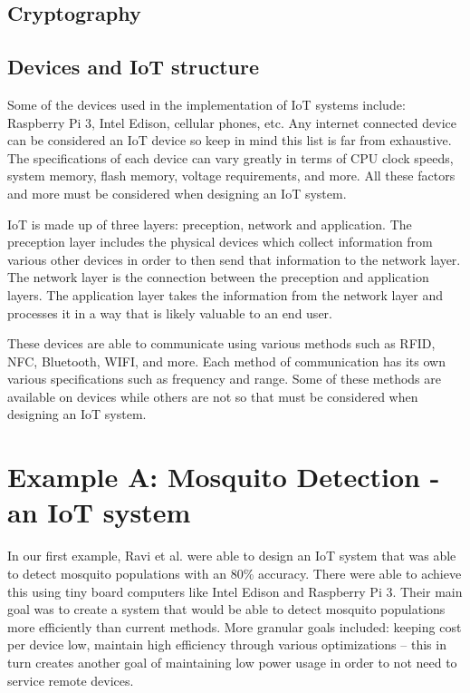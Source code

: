 \documentclass{sig-alternate}
\begin{document}
\subsection{Cryptography}
\label{sec:cryptography}


\subsection{Devices and IoT structure}
\label{sec:devices}


Some of the devices used in the implementation of IoT systems include: Raspberry Pi 3, Intel Edison, cellular phones, etc. Any internet connected device can be considered an IoT device so keep in mind this list is far from exhaustive. The specifications of each device can vary greatly in terms of CPU clock speeds, system memory, flash memory, voltage requirements, and more. All these factors and more must be considered when designing an IoT system.

IoT is made up of three layers: preception, network and application. The preception layer includes the physical devices which collect information from various other devices in order to then send that information to the network layer. The network layer is the connection between the preception and application layers. The application layer takes the information from the network layer and processes it in a way that is likely valuable to an end user.

These devices are able to communicate using various methods such as RFID, NFC, Bluetooth, WIFI, and more. Each method of communication has its own various specifications such as frequency and range. Some of these methods are available on devices while others are not so that must be considered when designing an IoT system.


\section{Example A: Mosquito Detection - an IoT system}
\label{sec:mosquito}

In our first example, Ravi et al. were able to design an IoT system that was able to detect mosquito populations with an 80\% accuracy. There were able to achieve this using tiny board computers like Intel Edison and Raspberry Pi 3. Their main goal was to create a system that would be able to detect mosquito populations more efficiently than current methods. More granular goals included: keeping cost per device low, maintain high efficiency through various optimizations -- this in turn creates another goal of maintaining low power usage in order to not need to service remote devices.
\end{document}
